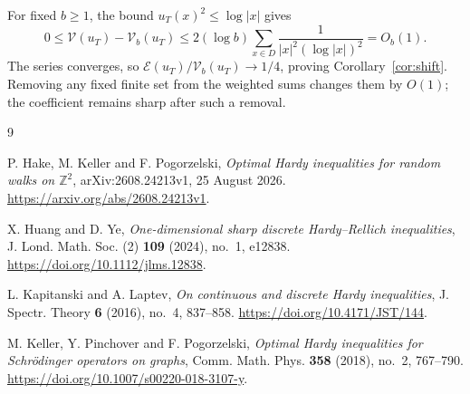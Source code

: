 \documentclass[11pt]{amsart}
\numberwithin{equation}{section}
\newcommand{\Z}{\mathbb Z}
\newcommand{\E}{\mathcal E}
\newcommand{\V}{\mathcal V}
\begin{document}
For fixed $b\ge1$, the bound $u_T(x)^2\le\log|x|$ gives
\[
0\le\V(u_T)-\V_b(u_T)
\le2(\log b)\sum_{x\in D}
\frac1{|x|^2(\log|x|)^2}=O_b(1).
\]
The series converges, so $\E(u_T)/\V_b(u_T)\to1/4$,
proving Corollary~\ref{cor:shift}.
Removing any fixed finite set from the weighted sums changes them
by $O(1)$; the coefficient remains sharp after such a removal.

\begin{thebibliography}{9}

P. Hake, M. Keller and F. Pogorzelski,
\emph{Optimal Hardy inequalities for random walks on $\Z^2$},
arXiv:2608.24213v1, 25 August 2026.
\url{https://arxiv.org/abs/2608.24213v1}.

X. Huang and D. Ye,
\emph{One-dimensional sharp discrete Hardy--Rellich inequalities},
J. Lond. Math. Soc. (2) \textbf{109} (2024), no.~1, e12838.
\url{https://doi.org/10.1112/jlms.12838}.

L. Kapitanski and A. Laptev,
\emph{On continuous and discrete Hardy inequalities},
J. Spectr. Theory \textbf{6} (2016), no.~4, 837--858.
\url{https://doi.org/10.4171/JST/144}.

M. Keller, Y. Pinchover and F. Pogorzelski,
\emph{Optimal Hardy inequalities for Schr\"odinger operators on graphs},
Comm. Math. Phys. \textbf{358} (2018), no.~2, 767--790.
\url{https://doi.org/10.1007/s00220-018-3107-y}.

\end{thebibliography}
\end{document}
